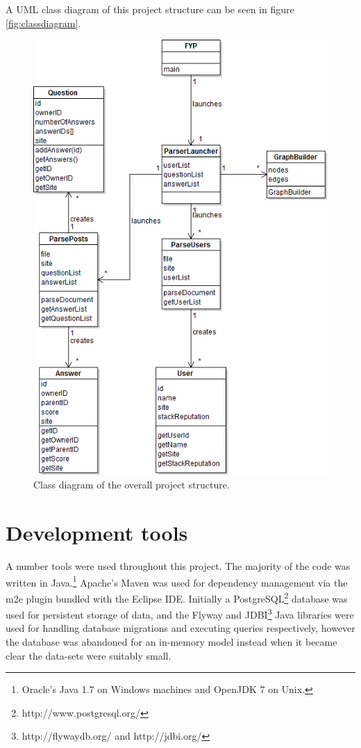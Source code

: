 \documentclass[]{final_report}
\begin{document}
A UML class diagram of this project structure can be seen in figure \ref{fig:classdiagram}.
\newpage
\begin{figure}[ht!]
\centering
\includegraphics[width=140mm]{chap4/classdiagram.png}
\caption{Class diagram of the overall project structure.}
\end{figure}\label{fig:classdiagram}

\newpage
\section{Development tools}

A number tools were used throughout this project. The majority of the code was written in Java.\footnote{Oracle's Java 1.7 on Windows machines and OpenJDK 7 on Unix.} Apache's Maven was used for dependency management via the m2e plugin bundled with the Eclipse IDE. Initially a PostgreSQL\footnote{http://www.postgresql.org/} database was used for persistent storage of data, and the Flyway and JDBI\footnote{http://flywaydb.org/ and http://jdbi.org/} Java libraries were used for handling database migrations and executing queries respectively, however the database was abandoned for an in-memory model instead when it became clear the data-sets were suitably small.
\end{document}
